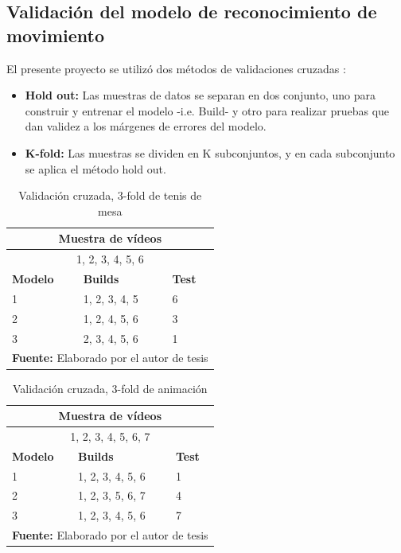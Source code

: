 \subsection{Validaci\'on del modelo de reconocimiento de movimiento}\label{dis:validate}
El presente proyecto se utiliz\'o dos m\'etodos de validaciones cruzadas \cite{perez2015analisis}:
\begin{itemize}
\item \textbf{Hold out:} Las muestras de datos se separan en dos conjunto, uno para construir y entrenar el modelo -i.e. Build- y otro para realizar pruebas que dan validez a los m\'argenes  de errores del modelo.
\item \textbf{K-fold:} Las muestras se dividen en K subconjuntos, y en cada subconjunto se aplica el m\'etodo hold out.
\end{itemize}  
\begin{table}[H]
\begin{center}
\caption{Validaci\'on cruzada, 3-fold de tenis de mesa}
\label{tab:KfoldTenis}
\begin{tabular}{|l|l|l|}
\hline
\multicolumn{3}{|c|}{\textbf{Muestra de v\'ideos}} \\ \hline
\multicolumn{3}{|c|}{1, 2, 3, 4, 5, 6} \\ \hline
\textbf{Modelo} & \textbf{Builds} & \textbf{Test} \\ \hline
1 & 1, 2, 3, 4, 5 & 6 \\ \hline
2 & 1, 2, 4, 5, 6 & 3 \\ \hline
3 & 2, 3, 4, 5, 6 & 1 \\ \hline
\multicolumn{3}{l}{\textbf{Fuente:} Elaborado por el autor de tesis}
\end{tabular}
\end{center}
\end{table}
\begin{table}[H]
\begin{center}
\caption{Validaci\'on cruzada, 3-fold de animaci\'on}
\label{tab:KfoldAnimacion}
\begin{tabular}{|l|l|l|}
\hline
\multicolumn{3}{|c|}{\textbf{Muestra de v\'ideos}} \\ \hline
\multicolumn{3}{|c|}{1, 2, 3, 4, 5, 6, 7} \\ \hline
\textbf{Modelo} & \textbf{Builds} & \textbf{Test} \\ \hline
1 & 1, 2, 3, 4, 5, 6 & 1 \\ \hline
2 & 1, 2, 3, 5, 6, 7 & 4 \\ \hline
3 & 1, 2, 3, 4, 5, 6 & 7 \\ \hline
\multicolumn{3}{l}{\textbf{Fuente:} Elaborado por el autor de tesis}
\end{tabular}
\end{center}
\end{table}
